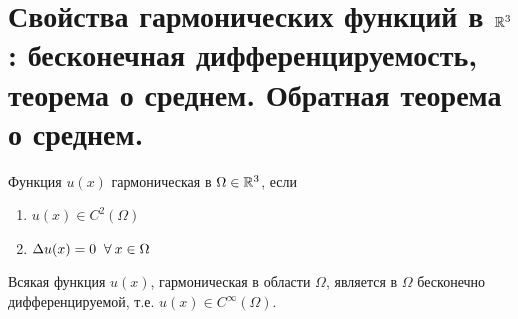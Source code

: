\section{Свойства гармонических функций в $\mathbb{R}^3$: бесконечная дифференцируемость, теорема о среднем. Обратная теорема о среднем.}
\begin{definition} Функция $u(x)$ гармоническая в $\Omega \in \mathbb{R}^3$, если 
\begin{enumerate}
\item $u(x) \in C^2 (\Omega)$
\item $\Delta u(x) = 0 \;\;\forall\: x \in \Omega$ 
\end{enumerate}
\end{definition}
\begin{theorem}
Всякая функция $u(x)$, гармоническая в области $\Omega$, является в $\Omega$ бесконечно дифференцируемой, т.е. $u(x) \in C^{\infty}(\Omega).$
\end{theorem}
